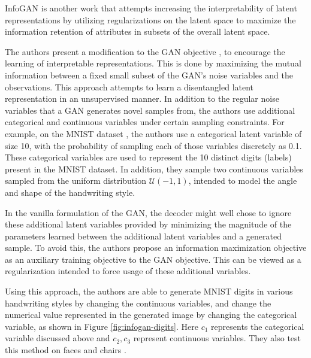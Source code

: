 InfoGAN \citep{chen2016infogan} is another work that attempts increasing the interpretability of latent representations by utilizing regularizations on the latent space to maximize the information retention of attributes in subsets of the overall latent space.

The authors present a modification to the GAN objective \citep{goodfellow2014generative}, to encourage the learning of interpretable representations. This is done by maximizing the
mutual information between a fixed small subset of the GAN's noise variables and the observations. This approach attempts to learn a disentangled latent representation in an unsupervised manner. In addition to the regular noise variables that a GAN generates novel samples from, the authors use additional categorical and continuous variables under certain sampling constraints. For example, on the MNIST dataset \citep{lecun2010mnist}, the authors use a categorical latent variable of size 10, with the probability of sampling each of those variables discretely as 0.1. These categorical variables are used to represent the 10 distinct digits (labels) present in the MNIST dataset. In addition, they sample two continuous variables sampled from the uniform distribution $\mathcal{U}(-1, 1)$, intended to model the angle and shape of the handwriting style.

In the vanilla formulation of the GAN, the decoder might well chose to ignore these additional latent variables provided by minimizing the magnitude of the parameters learned between the additional latent variables and a generated sample. To avoid this, the authors propose an information maximization objective as an auxiliary training objective to the GAN objective. This can be viewed as a regularization intended to force usage of these additional variables.

Using this approach, the authors are able to generate MNIST digits in various handwriting styles by changing the continuous variables, and change the numerical value represented in the generated image by changing the categorical variable, as shown in Figure \ref{fig:infogan-digits}. Here $c_1$ represents the categorical variable discussed above and $c_2, c_3$ represent continuous variables. They also test this method on faces \citep{liu2015deep,paysan20093d} and chairs \citep{aubry2014seeing}.

